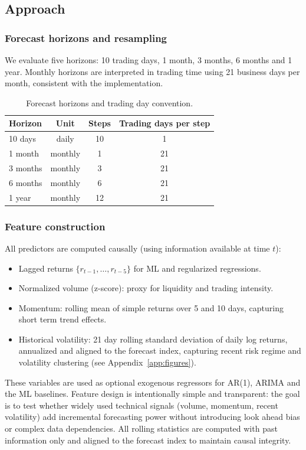 \documentclass[11pt,a4paper]{article}
\begin{document}
\subsection{Approach}
\label{subsec:approach}

\subsubsection{Forecast horizons and resampling}
We evaluate five horizons: 10 trading days, 1 month, 3 months, 6 months and 1 year. Monthly horizons are interpreted in trading time using 21 business days per month, consistent with the implementation.

\begin{table}[H]
\centering
\caption{Forecast horizons and trading day convention.}
\label{tab:horizons}
\begin{tabular}{l c c c}
\toprule
Horizon & Unit & Steps & Trading days per step \\
\midrule
10 days & daily & 10 & 1 \\
1 month & monthly & 1 & 21 \\
3 months & monthly & 3 & 21 \\
6 months & monthly & 6 & 21 \\
1 year & monthly & 12 & 21 \\
\bottomrule
\end{tabular}
\end{table}

\subsubsection{Feature construction}
All predictors are computed causally (using information available at time $t$):
\begin{itemize}[itemsep=0.35\baselineskip, topsep=0.2\baselineskip]
    \item Lagged returns $\{r_{t-1},\dots,r_{t-5}\}$ for ML and regularized regressions.
    \item Normalized volume (z-score): proxy for liquidity and trading intensity.
    \item Momentum: rolling mean of simple returns over 5 and 10 days, capturing short term trend effects.
    \item Historical volatility: 21 day rolling standard deviation of daily log returns, annualized and aligned to the forecast index, capturing recent risk regime and volatility clustering (see Appendix~\ref{app:figures}).
\end{itemize}
These variables are used as optional exogenous regressors for AR(1), ARIMA and the ML baselines. Feature design is intentionally simple and transparent: the goal is to test whether widely used technical signals (volume, momentum, recent volatility) add incremental forecasting power without introducing look ahead bias or complex data dependencies. All rolling statistics are computed with past information only and aligned to the forecast index to maintain causal integrity.
\end{document}
